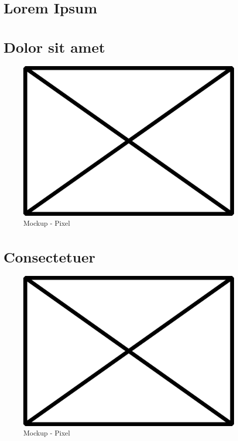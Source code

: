 \section{Lorem Ipsum}
\lipsum[1]
\citep[S. 1]{Mueller2011}

\section{Dolor sit amet}
\lipsum[2]
\citep{Doe2008}

\begin{figure}[H]
   \centering
   \includegraphics[width=14cm]{images/mockup_pixel.png}
   \caption{Mockup - Pixel}
\end{figure}

\section{Consectetuer}
\lipsum[8]

\begin{figure}[H]
   \centering
   \includegraphics[width=14cm]{images/mockup_pixel.png}
   \caption{Mockup - Pixel}
\end{figure}

